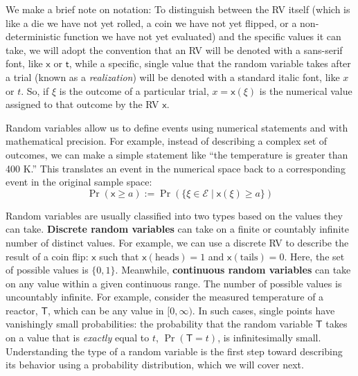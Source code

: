 We make a brief note on notation: To distinguish between the RV itself (which is like a die we have not yet rolled, a coin we have not yet flipped, or a non-deterministic function we have not yet evaluated) and the specific values it can take, we will adopt the convention that an RV will be denoted with a sans-serif font, like $\mathsf{x}$ or $\mathsf{t}$, while a specific, single value that the random variable takes after a trial (known as a \emph{realization}) will be denoted with a standard italic font, like $x$ or $t$. So, if $\xi$ is the outcome of a particular trial, $x = \mathsf{x}(\xi)$ is the numerical value assigned to that outcome by the RV $\mathsf{x}$.

Random variables allow us to define events using numerical statements and with mathematical precision. For example, instead of describing a complex set of outcomes, we can make a simple statement like ``the temperature is greater than 400 K.'' This translates an event in the numerical space back to a corresponding event in the original sample space:
\begin{equation}
    \Pr(\mathsf{x} \ge a) := \Pr(\{\xi \in \mathcal{E} \mid \mathsf{x}(\xi) \ge a\})
\end{equation}

Random variables are usually classified into two types based on the values they can take. \textbf{Discrete random variables} can take on a finite or countably infinite number of distinct values. For example, we can use a discrete RV to describe the result of a coin flip: $\mathsf{x}$ such that $\mathsf{x}(\text{heads}) = 1$ and $\mathsf{x}(\text{tails}) = 0$. Here, the set of possible values is $\{0, 1\}$. Meanwhile, \textbf{continuous random variables} can take on any value within a given continuous range. The number of possible values is uncountably infinite. For example, consider the measured temperature of a reactor, $\mathsf{T}$, which can be any value in $[0, \infty)$. In such cases, single points have vanishingly small probabilities: the probability that the random variable $\mathsf{T}$ takes on a value that is \emph{exactly} equal to $t$, $\Pr(\mathsf{T}=t)$, is infinitesimally small. Understanding the type of a random variable is the first step toward describing its behavior using a probability distribution, which we will cover next.

